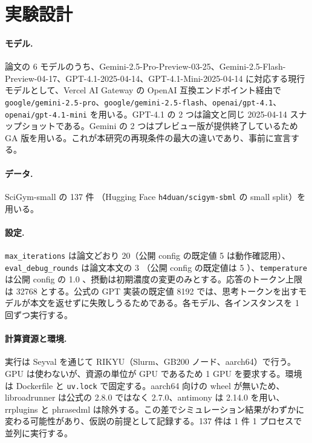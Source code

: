 \documentclass{article}
\begin{document}
\section{実験設計}
\label{sec:design}
\paragraph{モデル.}
論文の 6 モデルのうち、Gemini-2.5-Pro-Preview-03-25、Gemini-2.5-Flash-Preview-04-17、GPT-4.1-2025-04-14、GPT-4.1-Mini-2025-04-14 \cite[s1.p1]{duan-2025-measuring} に対応する現行モデルとして、Vercel AI Gateway の OpenAI 互換エンドポイント経由で \texttt{google/gemini-2.5-pro}、\texttt{google/gemini-2.5-flash}、\texttt{openai/gpt-4.1}、\texttt{openai/gpt-4.1-mini} を用いる。GPT-4.1 の 2 つは論文と同じ 2025-04-14 スナップショットである。Gemini の 2 つはプレビュー版が提供終了しているため GA 版を用いる。これが本研究の再現条件の最大の違いであり、事前に宣言する。

\paragraph{データ.}
SciGym-small の 137 件 \cite[s1.p2]{duan-2025-measuring}（Hugging Face \texttt{h4duan/scigym-sbml} の small split）を用いる。

\paragraph{設定.}
\texttt{max\_iterations} は論文どおり 20（公開 config の既定値 5 \cite[s2.p2]{h4duan-2025-scigym} は動作確認用）、\texttt{eval\_debug\_rounds} は論文本文の 3 \cite[s1.p4]{duan-2025-measuring}（公開 config の既定値は 5 \cite[s2.p3]{h4duan-2025-scigym}）、\texttt{temperature} は公開 config の 1.0 \cite[s2.p1]{h4duan-2025-scigym}、摂動は初期濃度の変更のみとする。応答のトークン上限は 32768 とする。公式の GPT 実装の既定値 8192 では、思考トークンを出すモデルが本文を返せずに失敗しうるためである。各モデル、各インスタンスを 1 回ずつ実行する。

\paragraph{計算資源と環境.}
実行は Seyval を通じて RIKYU（Slurm、GB200 ノード、aarch64）で行う。GPU は使わないが、資源の単位が GPU であるため 1 GPU を要求する。環境は Dockerfile と \texttt{uv.lock} で固定する。aarch64 向けの wheel が無いため、libroadrunner は公式の 2.8.0 ではなく 2.7.0、antimony は 2.14.0 を用い、rrplugins と phrasedml は除外する。この差でシミュレーション結果がわずかに変わる可能性があり、仮説の前提として記録する。137 件は 1 件 1 プロセスで並列に実行する。
\end{document}
